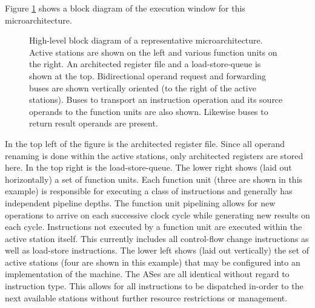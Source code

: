 \documentclass{book}
\begin{document}
Figure \ref{fig:overview} shows a block diagram
of the execution window for this microarchitecture.
%
%
\begin{figure}
\centerline{}
\caption[High-level block diagram of a representative microarchitecture]
{{ High-level block diagram of a representative microarchitecture.}
Active stations are shown on the left and various function
units on the right.  An architected register file and a
load-store-queue is shown at the top.
Bidirectional operand request and forwarding buses are shown
vertically oriented (to the right of the active stations).
Buses to transport an instruction operation and its source operands
to the function units are also shown. 
Likewise buses to return result operands are present.}
\label{fig:overview}
\end{figure}
%
%
In the top left of the figure is the architected register file.
Since all operand renaming is done within the active stations,
only architected registers are stored here.
In the top right is the load-store-queue.
The lower right shows (laid out horizontally) a set of function units.
Each function unit (three are shown in this example)
is responsible for executing a class of
instructions and generally has independent pipeline depths.
The function unit pipelining allows for new operations to arrive
on each successive clock cycle while generating new results on
each cycle.
Instructions not executed by a function unit
are executed within the active station itself.  This currently
includes all control-flow change instructions as well as load-store
instructions.  
The lower left shows (laid out vertically) the set of
active stations (four are shown in this example)
that may be configured into an implementation of
the machine.
The ASes are all identical without regard to 
instruction type.  This allows for all instructions to be
dispatched in-order to the next available stations
without further resource restrictions or management.
\end{document}
